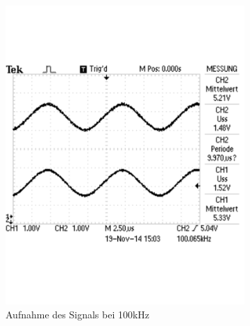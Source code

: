 \documentclass[12pt,a4paper]{article}
\begin{document}
\begin{figure}[H]
        \centering
        \begin{subfigure}[b]{0.28\textwidth}
                \includegraphics[width=\textwidth , scale = 0.4]{2_2_100k.pdf}
                \caption[Aufnahme des Signals bei 100kHz]{Aufnahme des Signals bei 100kHz}
                \label{fig:2_2_100k}
        \end{subfigure}%
        \hfill
        \begin{subfigure}[b]{0.28\textwidth}

\end{subfigure}
\end{figure}
\end{document}
